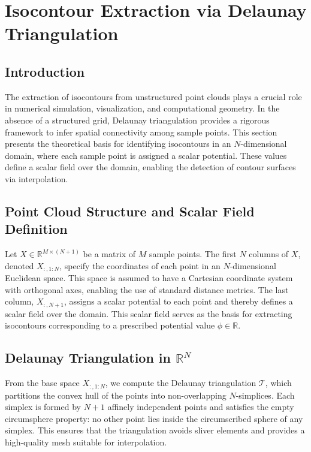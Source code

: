 \section{Isocontour Extraction via Delaunay Triangulation}

\subsection{Introduction}
The extraction of isocontours from unstructured point clouds plays a crucial role in numerical simulation, visualization, and computational geometry. In the absence of a structured grid, Delaunay triangulation provides a rigorous framework to infer spatial connectivity among sample points. This section presents the theoretical basis for identifying isocontours in an \(N\)-dimensional domain, where each sample point is assigned a scalar potential. These values define a scalar field over the domain, enabling the detection of contour surfaces via interpolation.

\subsection{Point Cloud Structure and Scalar Field Definition}
Let \( X \in \mathbb{R}^{M \times (N+1)} \) be a matrix of \( M \) sample points. The first \( N \) columns of \( X \), denoted \( X_{:,1:N} \), specify the coordinates of each point in an \( N \)-dimensional Euclidean space. This space is assumed to have a Cartesian coordinate system with orthogonal axes, enabling the use of standard distance metrics. The last column, \( X_{:,N+1} \), assigns a scalar potential to each point and thereby defines a scalar field over the domain. This scalar field serves as the basis for extracting isocontours corresponding to a prescribed potential value \( \phi \in \mathbb{R} \).

\subsection{Delaunay Triangulation in \texorpdfstring{\( \mathbb{R}^N \)}{R\^N}}
From the base space \( X_{:,1:N} \), we compute the Delaunay triangulation \( \mathcal{T} \), which partitions the convex hull of the points into non-overlapping \(N\)-simplices. Each simplex is formed by \( N+1 \) affinely independent points and satisfies the empty circumsphere property: no other point lies inside the circumscribed sphere of any simplex. This ensures that the triangulation avoids sliver elements and provides a high-quality mesh suitable for interpolation.

